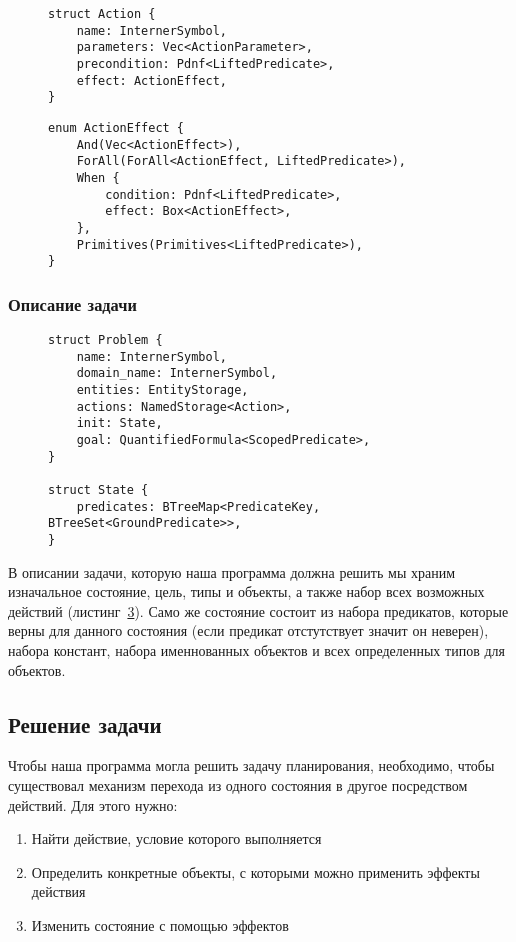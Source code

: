 \documentclass{article}
\begin{document}
\begin{figure}
  \begin{verbatim}
struct Action {
    name: InternerSymbol,
    parameters: Vec<ActionParameter>,
    precondition: Pdnf<LiftedPredicate>,
    effect: ActionEffect,
}
  \end{verbatim}
  \label{code:action}
\end{figure}

\begin{figure}
  \begin{verbatim}
enum ActionEffect {
    And(Vec<ActionEffect>),
    ForAll(ForAll<ActionEffect, LiftedPredicate>),
    When {
        condition: Pdnf<LiftedPredicate>,
        effect: Box<ActionEffect>,
    },
    Primitives(Primitives<LiftedPredicate>),
}
  \end{verbatim}
  \label{code:effect}
\end{figure}

\subsubsection{Описание задачи}

\begin{figure}
  \begin{verbatim}
struct Problem {
    name: InternerSymbol,
    domain_name: InternerSymbol,
    entities: EntityStorage,
    actions: NamedStorage<Action>,
    init: State,
    goal: QuantifiedFormula<ScopedPredicate>,
}

struct State {
    predicates: BTreeMap<PredicateKey, BTreeSet<GroundPredicate>>,
}
  \end{verbatim}
  \label{code:problem}
\end{figure}

В описании задачи, которую наша программа должна решить мы храним изначальное состояние,
цель, типы и объекты, а также набор всех возможных действий (листинг~\ref{code:problem}).
Само же состояние состоит из набора предикатов, которые верны для данного состояния
(если предикат отстутствует значит он неверен), набора констант, набора именнованных объектов
и всех определенных типов для объектов.

\subsection{Решение задачи}

Чтобы наша программа могла решить задачу планирования, необходимо,
чтобы существовал механизм перехода из одного состояния в другое посредством действий.
Для этого нужно:
\begin{enumerate}
  \item Найти действие, условие которого выполняется
  \item Определить конкретные объекты, с которыми можно применить эффекты действия
  \item Изменить состояние с помощью эффектов
\end{enumerate}
\end{document}
